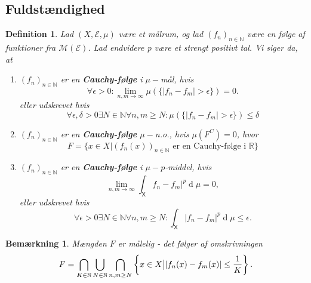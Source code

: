 \documentclass{article}
\newcommand{\N}{\mathbb{N}}
\newcommand{\R}{\mathbb{R}}
\newcommand{\1}{\mathbbm{1}}
\newcommand{\X}{\mathsf{X}}
\newcommand{\deriv}{\operatorname{d}}
\newtheorem{definition}[theorem]{Definition}
\newtheorem{remark}[theorem]{Bemærkning}
\theoremstyle{boxed}
\begin{document}
\subsection{Fuldstændighed}
\begin{theorem-box}
    \begin{definition}
        Lad $(X,\mathcal{E},\mu)$ være et målrum, og lad $(f_n)_{n\in\N}$ være en følge af funktioner fra $\mathcal{M}(\mathcal{E})$. Lad endvidere p være et strengt positivt tal. Vi siger da, at 
        \begin{enumerate}
            \item[\textnormal{(a)}] $(f_n)_{n\in\N}$ er en \textbf{Cauchy-følge} i $\mu-$mål, hvis
            $$\forall\epsilon>0: \lim_{n,m\rightarrow \infty}\mu\left(\{|f_n-f_m|>\epsilon\}\right)=0.$$
            eller udskrevet hvis 
            $$\forall\epsilon,\delta>0\exists N\in\N\forall n,m\geq N: \mu\left(\{|f_n-f_m|>\epsilon\}\right)\leq \delta$$
            \item[\textnormal{(b)}] $(f_n)_{n\in\N}$ er en \textbf{Cauchy-følge} $\mu-$n.o., hvis $\mu(F^C)=0$, hvor
            $$F=\{x\in X|(f_n(x))_{n\in\N}\text{ er en Cauchy-følge i }\R\}$$
            \item[\textnormal{(c)}] $(f_n)_{n\in\N}$ er en \textbf{Cauchy-følge} i $\mu-p$-middel, hvis
            $$\lim_{n,m\rightarrow \infty}\int_\X f_n-f_m|^p\deriv \mu  = 0,$$
            eller udskrevet hvis 
            $$\forall \epsilon>0\exists N\in\N\forall n,m\geq N:\int_\X |f_n-f_m|^p\deriv\mu\leq\epsilon.$$
        \end{enumerate}
    \end{definition}
\end{theorem-box}
\begin{remark}
    Mængden $F$ er målelig - det følger af omskrivningen $$F=\bigcap_{K\in\N}\bigcup_{N\in\N}\bigcap_{n,m\geq N}\left\{x\in X\big{|}|f_n(x)-f_m(x)|\leq \frac{1}{K}\right\}.$$
\end{remark}
\end{document}

